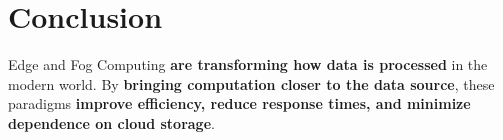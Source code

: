 \documentclass[a4paper,12pt]{article}
\begin{document}
	\section{Conclusion}
	Edge and Fog Computing \textbf{are transforming how data is processed} in the modern world. By \textbf{bringing computation closer to the data source}, these paradigms \textbf{improve efficiency, reduce response times, and minimize dependence on cloud storage}.
	
	
	
	
\end{document}
